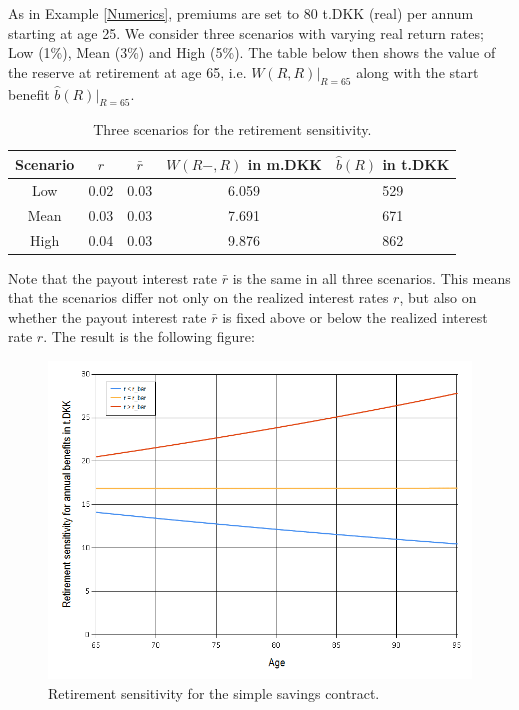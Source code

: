 \documentclass{article}
\newcommand{\1}[1]{\mathbbm{1}_{\left\lbrace #1 \right\rbrace}}
\theoremstyle{break}
\theoremstyle{remark}
\numberwithin{equation}{section}
\begin{document}
\begin{example}
As in Example \ref{Numerics}, premiums are set to 80 t.DKK (real) per annum starting at age 25. We consider three scenarios with varying real return rates; Low (1\%), Mean (3\%) and High (5\%). The table below then shows the value of the reserve at retirement at age 65, i.e. $W(R,R)|_{R=65}$ along with the start benefit $\hat{b}(R)|_{R=65}$.

\begin{table}[H]
	\caption{Three scenarios for the retirement sensitivity.}
	\begin{center}
	\begin{tabular}{ |c|c|c|c|c| }
		\hline
		Scenario & $r$ & $\bar{r}$ & $W(R-,R)$ in m.DKK & $\hat{b}(R)$ in t.DKK \\
		\hline
		Low & 0.02 & 0.03 & 6.059 & 529 \\
		Mean & 0.03 & 0.03 & 7.691 & 671 \\
		High & 0.04 & 0.03 & 9.876 & 862 \\
		\hline
	\end{tabular}
\end{center}
\end{table}

Note that the payout interest rate $\bar{r}$ is the same in all three scenarios. This means that the scenarios differ not only on the realized interest rates $r$, but also on whether the payout interest rate $\bar{r}$ is fixed above or below the realized interest rate $r$. The result is the following figure:

\begin{figure}[H] \label{RSensiGraph}
	\centering
	\caption{Retirement sensitivity for the simple savings contract.}
	\includegraphics[width=\textwidth]{Rsensi}		
\end{figure}


\end{example}
\end{document}
